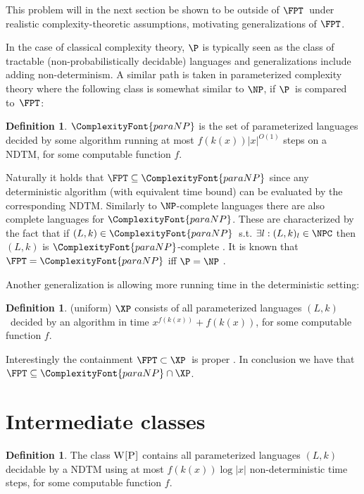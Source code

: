 \documentclass[a4paper,11pt]{report}
\theoremstyle{plain}
\theoremstyle{definition}
\newtheorem{defn}[thm]{Definition} %
\newcommand{\PARANP}{\ComplexityFont{paraNP}}
\begin{document}
This problem will in the next section be shown to be outside of $\FPT$ under realistic complexity-theoretic assumptions, motivating generalizations of $\FPT$.

In the case of classical complexity theory, $\P$ is typically seen as the class of tractable (non-probabilistically decidable) languages and generalizations include adding non-determinism.
A similar path is taken in parameterized complexity theory where the following class is somewhat similar to $\NP$, if $\P$ is compared to $\FPT$:

\begin{defn}
$\PARANP$ is the set of parameterized languages decided by some algorithm running at most $f(k(x)) |x|^{O(1)}$ steps on a NDTM, for some computable function $f$.
\end{defn}

Naturally it holds that $\FPT \subseteq \PARANP$ since any deterministic algorithm (with equivalent time bound) can be evaluated by the corresponding NDTM.
Similarly to $\NP$-complete languages there are also complete languages for $\PARANP$.
These are characterized by the fact that if $(L, k) \in \PARANP$ s.t. $\exists l : (L, k)_l \in \NPC$ then $(L, k)$ is $\PARANP$-complete \cite{FG06}.
It is known that $\FPT = \PARANP$ iff $\P = \NP$ \cite{FG06}.

Another generalization is allowing more running time in the deterministic setting:

\begin{defn}
(uniform) $\XP$ consists of all parameterized languages $(L, k)$ decided by an algorithm in time
$x^{f(k(x))} + f(k(x))$, for some computable function $f$.
\end{defn}


Interestingly the containment $\FPT \subset \XP$ is proper \cite{FG06}.
In conclusion we have that $\FPT \subseteq \PARANP \cap \XP$.

\section{Intermediate classes}

\begin{defn}
The class $\textsc{W[P]}$ contains all parameterized languages $(L, k)$ decidable by a NDTM using at most $f(k(x)) \log |x| $ non-deterministic time steps, for some computable function $f$.
\end{defn}
\end{document}
